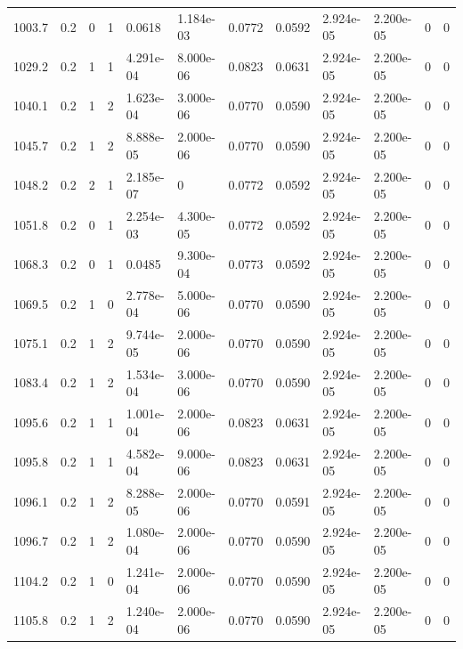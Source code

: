 \documentclass[preview]{standalone}
\begin{document}
{{{\begin{tabular}{L{1.2cm}C{1.2cm} C{0.3cm}C{0.5cm} C{1.4cm}C{1.4cm} C{1.4cm}C{1.4cm} C{1.6cm}C{1.6cm} C{1.6cm}C{1.6cm}}
  1003.7  &   0.2  & 0     &  1 &  0.0618  & 1.184e-03  &  0.0772&   0.0592& 2.924e-05 & 2.200e-05   &  0 & 0  \\ 
  1029.2  &   0.2  & 1     &  1 &  4.291e-04  & 8.000e-06  &  0.0823&   0.0631& 2.924e-05 & 2.200e-05   &  0 & 0  \\ 
  1040.1  &   0.2  & 1     &  2 &  1.623e-04  & 3.000e-06  &  0.0770&   0.0590& 2.924e-05 & 2.200e-05   &  0 & 0  \\ 
  1045.7  &   0.2  & 1     &  2 &  8.888e-05  & 2.000e-06  &  0.0770&   0.0590& 2.924e-05 & 2.200e-05   &  0 & 0  \\ 
  1048.2  &   0.2  & 2     &  1 &  2.185e-07  & 0  &  0.0772&   0.0592& 2.924e-05 & 2.200e-05   &  0 & 0  \\ 
  1051.8  &   0.2  & 0     &  1 &  2.254e-03  & 4.300e-05  &  0.0772&   0.0592& 2.924e-05 & 2.200e-05   &  0 & 0  \\ 
  1068.3  &   0.2  & 0     &  1 &  0.0485  & 9.300e-04  &  0.0773&   0.0592& 2.924e-05 & 2.200e-05   &  0 & 0  \\ 
  1069.5  &   0.2  & 1     &  0 &  2.778e-04  & 5.000e-06  &  0.0770&   0.0590& 2.924e-05 & 2.200e-05   &  0 & 0  \\ 
  1075.1  &   0.2  & 1     &  2 &  9.744e-05  & 2.000e-06  &  0.0770&   0.0590& 2.924e-05 & 2.200e-05   &  0 & 0  \\ 
  1083.4  &   0.2  & 1     &  2 &  1.534e-04  & 3.000e-06  &  0.0770&   0.0590& 2.924e-05 & 2.200e-05   &  0 & 0  \\ 
  1095.6  &   0.2  & 1     &  1 &  1.001e-04  & 2.000e-06  &  0.0823&   0.0631& 2.924e-05 & 2.200e-05   &  0 & 0  \\ 
  1095.8  &   0.2  & 1     &  1 &  4.582e-04  & 9.000e-06  &  0.0823&   0.0631& 2.924e-05 & 2.200e-05   &  0 & 0  \\ 
  1096.1  &   0.2  & 1     &  2 &  8.288e-05  & 2.000e-06  &  0.0770&   0.0591& 2.924e-05 & 2.200e-05   &  0 & 0  \\ 
  1096.7  &   0.2  & 1     &  2 &  1.080e-04  & 2.000e-06  &  0.0770&   0.0590& 2.924e-05 & 2.200e-05   &  0 & 0  \\ 
  1104.2  &   0.2  & 1     &  0 &  1.241e-04  & 2.000e-06  &  0.0770&   0.0590& 2.924e-05 & 2.200e-05   &  0 & 0  \\ 
  1105.8  &   0.2  & 1     &  2 &  1.240e-04  & 2.000e-06  &  0.0770&   0.0590& 2.924e-05 & 2.200e-05   &  0 & 0  \\ 
\hline 
\end{tabular} 

}}}
\end{document}
